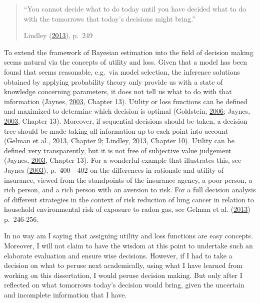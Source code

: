 \documentclass[openright,titlepage,12pt,a4paper]{book}
\begin{document}
\begin{quote}
``You cannot decide what to do today until you have decided what to do with the tomorrows that today's decisions might bring.''

Lindley (\protect\hyperlink{ref-lindley_understanding_2013}{2013}), p.~249
\end{quote}

To extend the framework of Bayesian estimation into the field of decision making seems natural via the concepts of utility and loss. Given that a model has been found that seems reasonable, e.g.~via model selection, the inference solutions obtained by applying probability theory only provide us with a state of knowledge concerning parameters, it does not tell us what to do with that information (Jaynes, \protect\hyperlink{ref-jaynes_probability_2003}{2003}, Chapter 13). Utility or loss functions can be defined and maximized to determine which decision is optimal (Goldstein, \protect\hyperlink{ref-goldstein_subjective_2006}{2006}; Jaynes, \protect\hyperlink{ref-jaynes_probability_2003}{2003}, Chapter 13). Moreover, if sequential decisions should be taken, a decision tree should be made taking all information up to each point into account (Gelman et al., \protect\hyperlink{ref-gelman_bayesian_2013}{2013}, Chapter 9; Lindley, \protect\hyperlink{ref-lindley_understanding_2013}{2013}, Chapter 10). Utility can be defined very transparently, but it is not free of subjective value judgement (Jaynes, \protect\hyperlink{ref-jaynes_probability_2003}{2003}, Chapter 13). For a wonderful example that illustrates this, see Jaynes (\protect\hyperlink{ref-jaynes_probability_2003}{2003}), p.~400 - 402 on the differences in rationale and utility of insurance, viewed from the standpoints of the insurance agency, a poor person, a rich person, and a rich person with an aversion to risk. For a full decision analysis of different strategies in the context of risk reduction of lung cancer in relation to household environmental risk of exposure to radon gas, see Gelman et al. (\protect\hyperlink{ref-gelman_bayesian_2013}{2013}) p.~246-256.

In no way am I saying that assigning utility and loss functions are easy concepts. Moreover, I will not claim to have the wisdom at this point to undertake such an elaborate evaluation and ensure wise decisions. However, if I had to take a decision on what to peruse next academically, using what I have learned from working on this dissertation, I would peruse decision making. But only after I reflected on what tomorrows today's decision would bring, given the uncertain and incomplete information that I have.
\end{document}
